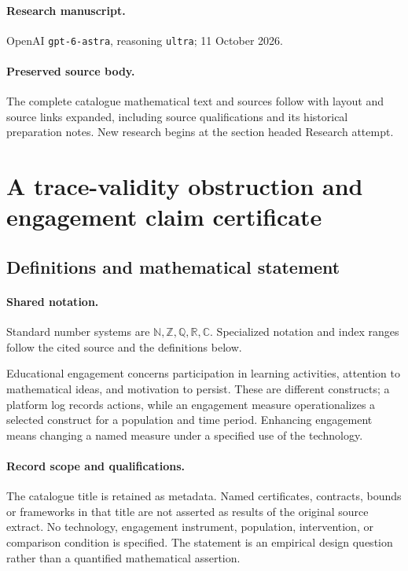 \documentclass[11pt]{article}
\begin{document}
\paragraph{Research manuscript.} OpenAI \texttt{gpt-6-astra}, reasoning \texttt{ultra}; 11 October 2026.
\paragraph{Preserved source body.} The complete catalogue mathematical text and sources follow with layout and source links expanded, including source qualifications and its historical preparation notes. New research begins at the section headed Research attempt.

\section{A trace-validity obstruction and engagement claim certificate}\label{statement}

\subsection{Definitions and mathematical statement}

\paragraph{Shared notation.}Standard number systems are $\mathbb N,\mathbb Z,\mathbb Q,\mathbb R,\mathbb C$. Specialized notation and index ranges follow the cited source and the definitions below.


Educational engagement concerns participation in learning activities, attention to mathematical ideas, and motivation to persist. These are different constructs; a platform log records actions, while an engagement measure operationalizes a selected construct for a population and time period. Enhancing engagement means changing a named measure under a specified use of the technology.
\paragraph{Record scope and qualifications.}
The catalogue title is retained as metadata. Named certificates, contracts, bounds or frameworks in that title are not asserted as results of the original source extract.
No technology, engagement instrument, population, intervention, or comparison condition is specified. The statement is an empirical design question rather than a quantified mathematical assertion.
\end{document}
